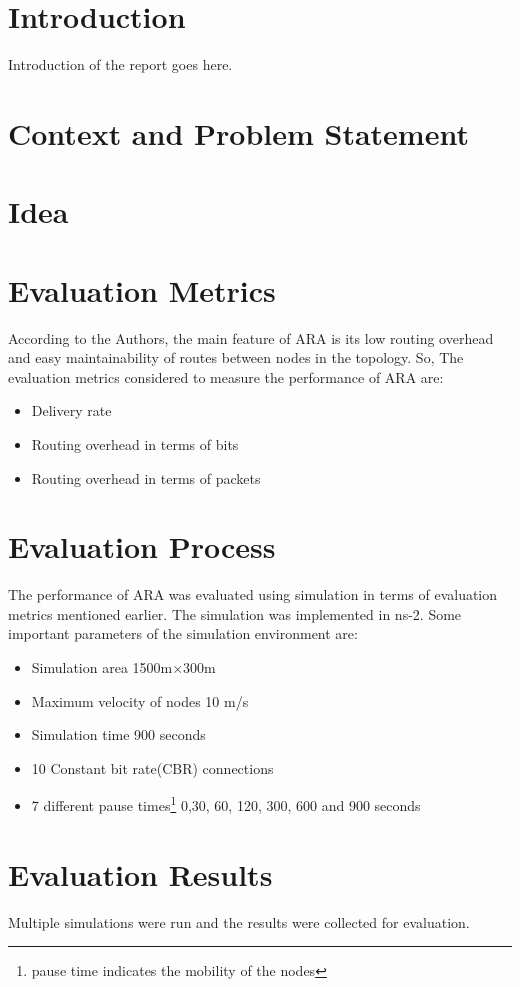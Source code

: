 \section{Introduction}
Introduction of the report goes here. 


\section{Context and Problem Statement}


\section{Idea}

\section{Evaluation Metrics}
According to the Authors, the main feature of ARA is its low routing overhead and easy maintainability of routes between nodes in the topology. So, The evaluation metrics considered to measure the performance of ARA are:
\begin{itemize}
\item Delivery rate 
\item Routing overhead in terms of bits
\item Routing overhead in terms of packets
\end{itemize}

\section{Evaluation Process}
The performance of ARA was evaluated using simulation in terms of evaluation metrics mentioned earlier. 
The simulation was implemented in ns-2. Some important parameters of the simulation environment are:

\begin{itemize}
\item Simulation area  1500m×300m 
\item Maximum velocity of nodes 10 m/s
\item Simulation time  900 seconds
\item 10 Constant bit rate(CBR) connections
\item 7 different pause times\footnote{pause time indicates the mobility of the nodes} 0,30, 60, 120, 300, 600 and 900 seconds
\end{itemize}


\section{Evaluation Results}
Multiple simulations were run and the results were collected for evaluation. 
